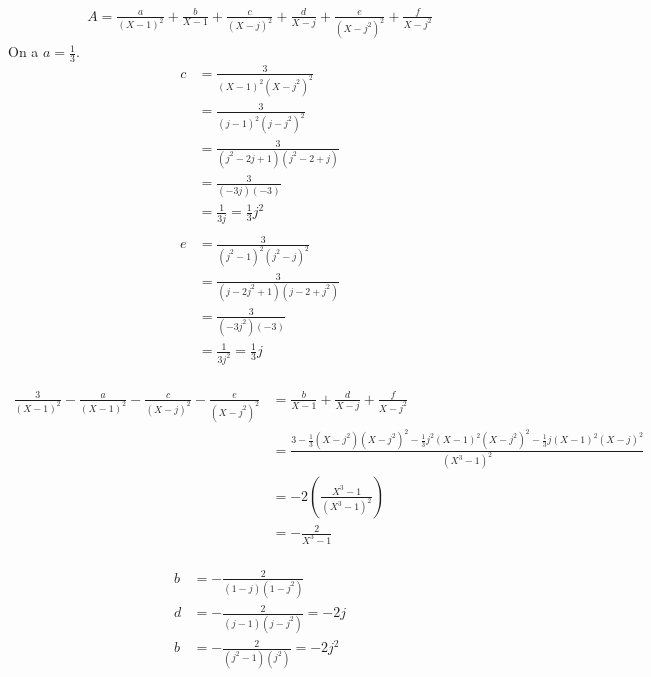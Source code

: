 \begin{enumerate}
		\begin{align*}
			A = \frac{a}{(X-1)^2} + \frac{b}{X-1} + \frac{c}{(X-j)^2} + \frac{d}{X-j} + \frac{e}{(X-j^2)^2} + \frac{f}{X-j^2}
		\end{align*}
		On a $a = \frac{1}{3}$.
		\begin{align*}
			c &= \frac{3}{(X-1)^2(X-j^2)^2}\\
			&= \frac{3}{(j-1)^2(j-j^2)^2} \\
			&= \frac{3}{(j^2-2j+1)(j^2-2+j)} \\
			&= \frac{3}{(-3j)(-3)} \\
			&= \frac{1}{3j} = \frac{1}{3}j^2 \\
		\end{align*}
		\begin{align*}
			e &= \frac{3}{(j^2-1)^2(j^2-j)^2} \\
			&= \frac{3}{(j-2j^2 + 1)(j-2+j^2)} \\
			&= \frac{3}{(-3j^2)(-3)} \\
			&= \frac{1}{3j^2} = \frac{1}{3}j \\
		\end{align*}

		\begin{landscape}
			\begin{align*}
				\frac{3}{(X-1)^2}-\frac{a}{(X-1)^2}-\frac{c}{(X-j)^2}-\frac{e}{(X-j^2)^2} &= \frac{b}{X-1} + \frac{d}{X-j}+\frac{f}{X-j^2} \\
				&= \frac{3 - \frac{1}{3}(X-j^2)(X-j^2)^2-\frac{1}{3}j^2(X-1)^2(X-j^2)^2-\frac{1}{3}j(X-1)^2(X-j)^2}{(X^3-1)^2} \\
				&= -2\left( \frac{X^3-1}{(X^3-1)^2} \right) \\
				&= -\frac{2}{X^3-1} \\
			\end{align*}

			\begin{align*}
				b &= -\frac{2}{(1-j)(1-j^2)}\\
				d &= -\frac{2}{(j-1)(j-j^2)} = -2j \\
				b &= -\frac{2}{(j^2-1)(j^2)} = -2j^2 \\
			\end{align*}
		\end{landscape}
\end{enumerate}
